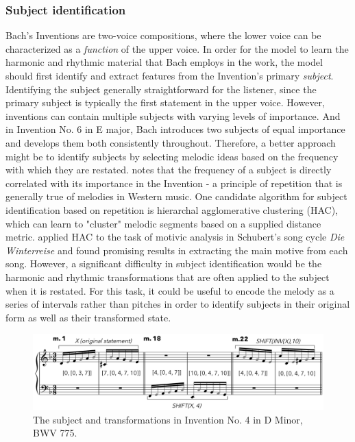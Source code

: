 \documentclass[11pt]{book}
\begin{document}
\subsubsection{Subject identification}
Bach's Inventions are two-voice compositions, where the lower voice can be characterized as a \textit{function} of the upper voice. In order for the model to learn the harmonic and rhythmic material that Bach employs in the work, the model should first identify and extract features from the Invention's primary \textit{subject}. Identifying the subject generally straightforward for the listener, since the primary subject is typically the first statement in the upper voice. However, inventions can contain multiple subjects with varying levels of importance. And in Invention No. 6 in E major, Bach introduces two subjects of equal importance and develops them both consistently throughout. Therefore, a better approach might be to identify subjects by selecting melodic ideas based on the frequency with which they are restated. \citet{dreyfus1996bach} notes that the frequency of a subject is directly correlated with its importance in the Invention - a principle of repetition that is generally true of melodies in Western music. One candidate algorithm for subject identification based on repetition is hierarchal agglomerative clustering (HAC), which can learn to "cluster" melodic segments based on a supplied distance metric. \citet{nagler2014schubot} applied HAC to the task of motivic analysis in Schubert's song cycle \textit{Die Winterreise} and found promising results in extracting the main motive from each song. However, a significant difficulty in subject identification would be the harmonic and rhythmic transformations that are often applied to the subject when it is restated. For this task, it could be useful to encode the melody as a series of intervals rather than pitches in order to identify subjects in their original form as well as their transformed state. \\

\begin{figure}[h]
\caption{ The subject and transformations in Invention No. 4 in D Minor, BWV 775.  }
\centerline{\includegraphics[scale=0.3]{examples/ex1}}
\end{figure}
\end{document}
